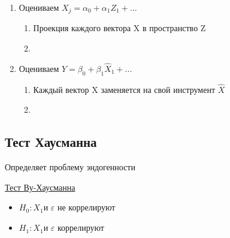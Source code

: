 \documentclass[a4paper, 12pt]{article}
\begin{document}
\begin{enumerate}
    \item Оцениваем $X_{j} = \alpha_{0} + \alpha_{1}Z_{1} + ...$
    \begin{enumerate}
        \item Проекция каждого вектора X в пространство Z
        \item {}
    \end{enumerate}
    \item Оцениваем $Y = \beta_{0} + \beta_{1} \hat{X}_{1} + ...$
    \begin{enumerate}
        \item Каждый вектор X заменяется на свой инструмент $\hat{X}$
        \item {}
    \end{enumerate}
\end{enumerate}

\subsection{Тест Хаусманна}

\begin{center}
    Определяет проблему эндогенности
\end{center}


\begin{center}
    \underline{Тест Ву-Хаусманна}
\end{center}

\begin{itemize}
    \item $H_{0}: X_{1} \textrm{и } \varepsilon$ не коррелируют
    \item $H_{1}: X_{1} \textrm{и } \varepsilon$ коррелируют
\end{itemize}
\end{document}
